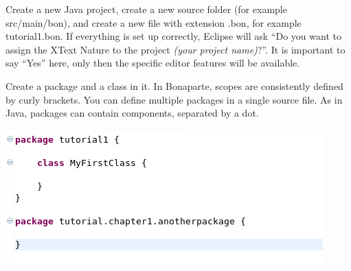 \documentclass[11pt,a4paper,oneside]{article}
\begin{document}
Create a new Java project, create a new source folder (for example {\ttfamily src/main/bon}), and create a new file with extension {\ttfamily .bon},
for example {\ttfamily tutorial1.bon}. If everything is set up correctly, Eclipse will ask ``Do you want to assign the XText
Nature to the project {\it{ (your project name)}}?''.
It is important to say ``Yes'' here, only then the specific editor features will be available.

Create a package and a class in it. In Bonaparte, scopes are consistently defined by curly brackets. You can define multiple packages in a single source file.
As in Java, packages can contain components, separated by a dot.

\vspace{2mm}
\hspace{1cm}\includegraphics[scale=0.5]{images/tut1-001.png}
\end{document}
